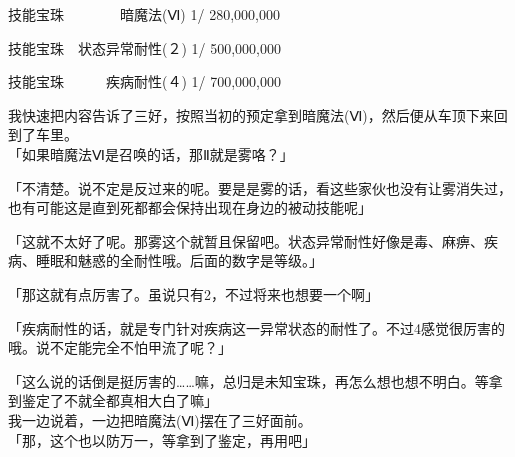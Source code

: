   技能宝珠　　　　暗魔法(Ⅵ) 1/ 280,000,000

  技能宝珠　状态异常耐性(２) 1/ 500,000,000

  技能宝珠　　　疾病耐性(４) 1/ 700,000,000

\cardline

我快速把内容告诉了三好，按照当初的预定拿到暗魔法(Ⅵ)，然后便从车顶下来回到了车里。\\

「如果暗魔法Ⅵ是召唤的话，那Ⅱ就是雾咯？」

「不清楚。说不定是反过来的呢。要是是雾的话，看这些家伙也没有让雾消失过，也有可能这是直到死都都会保持出现在身边的被动技能呢」

「这就不太好了呢。那雾这个就暂且保留吧。状态异常耐性好像是毒、麻痹、疾病、睡眠和魅惑的全耐性哦。后面的数字是等级。」

「那这就有点厉害了。虽说只有2，不过将来也想要一个啊」

「疾病耐性的话，就是专门针对疾病这一异常状态的耐性了。不过4感觉很厉害的哦。说不定能完全不怕甲流了呢？」

「这么说的话倒是挺厉害的……嘛，总归是未知宝珠，再怎么想也想不明白。等拿到鉴定了不就全都真相大白了嘛」\\

我一边说着，一边把暗魔法(Ⅵ)摆在了三好面前。\\

「那，这个也以防万一，等拿到了鉴定，再用吧」

